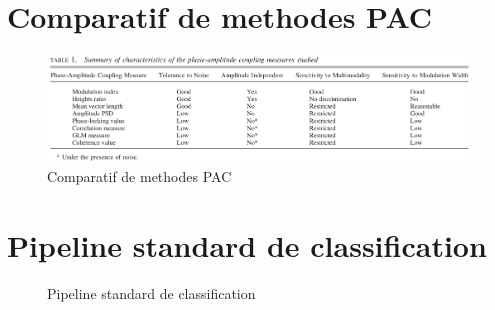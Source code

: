 \section{Comparatif de methodes PAC \citep{tort_measuring_2010}}
\begin{figure}[H]
	\centering
	\includegraphics[scale=0.4,angle=-90]{./figures/PAC_methods_comparison}
	\caption{Comparatif de methodes PAC \citep{tort_measuring_2010}}
	\label{comp_pac}
\end{figure}

\section{Pipeline standard de classification}
\begin{figure}[H]
	\centering
	\caption{Pipeline standard de classification}
	\label{clf_pip}
\end{figure}

